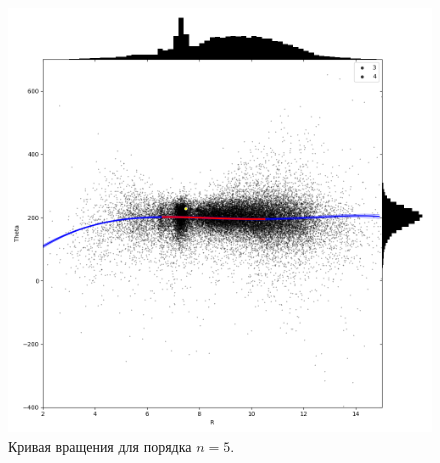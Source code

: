 \documentclass{matmex-diploma-custom}
\begin{document}
\begin{figure}[h!!]
\caption{Кривая вращения для порядка $n=5$.}


\begin{center}
\begin{minipage}[h!!]{0.95\linewidth}
        \includegraphics[width=1.0\textwidth]{../imgs/theta_obj.png}
\end{minipage}
\end{center}
\end{figure}


%
\end{document}

